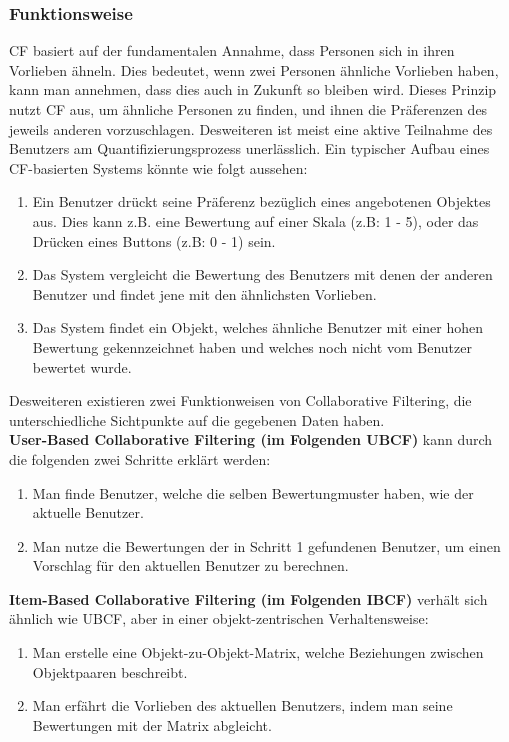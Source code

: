 \documentclass[german,a4paper]{article}
\begin{document}
\subsubsection{Funktionsweise}
CF basiert auf der fundamentalen Annahme, dass Personen sich in ihren Vorlieben ähneln. Dies bedeutet, wenn zwei Personen ähnliche Vorlieben haben, kann man annehmen, dass dies auch in Zukunft so bleiben wird. Dieses Prinzip nutzt CF aus, um ähnliche Personen zu finden, und ihnen die Präferenzen des jeweils anderen vorzuschlagen. Desweiteren ist meist eine aktive Teilnahme des Benutzers am Quantifizierungsprozess unerlässlich. Ein typischer Aufbau eines CF-basierten Systems könnte wie folgt aussehen:
\begin{enumerate}
\item Ein Benutzer drückt seine Präferenz bezüglich eines angebotenen Objektes aus. Dies kann z.B. eine Bewertung auf einer Skala (z.B: 1 - 5), oder das Drücken eines Buttons (z.B: 0 - 1) sein.
\item Das System vergleicht die Bewertung des Benutzers mit denen der anderen Benutzer und findet jene mit den ähnlichsten Vorlieben.
\item Das System findet ein Objekt, welches ähnliche Benutzer mit einer hohen Bewertung gekennzeichnet haben und welches noch nicht vom Benutzer bewertet wurde. 
\end{enumerate}
Desweiteren existieren zwei Funktionweisen von Collaborative Filtering, die unterschiedliche Sichtpunkte auf die gegebenen Daten haben.
\\
\textbf{User-Based Collaborative Filtering (im Folgenden UBCF)} kann durch die folgenden zwei Schritte erklärt werden:
\begin{enumerate}
\item Man finde Benutzer, welche die selben Bewertungmuster haben, wie der aktuelle Benutzer.
 \item Man nutze die Bewertungen der in Schritt 1 gefundenen Benutzer, um einen Vorschlag für den aktuellen Benutzer zu berechnen.
\end{enumerate}
\textbf{Item-Based Collaborative Filtering (im Folgenden IBCF)} verhält sich ähnlich wie UBCF, aber in einer objekt-zentrischen Verhaltensweise:
\begin{enumerate}
\item Man erstelle eine Objekt-zu-Objekt-Matrix, welche Beziehungen zwischen Objektpaaren beschreibt.
\item Man erfährt die Vorlieben des aktuellen Benutzers, indem man seine Bewertungen mit der Matrix abgleicht.
\end{enumerate}
\end{document}
